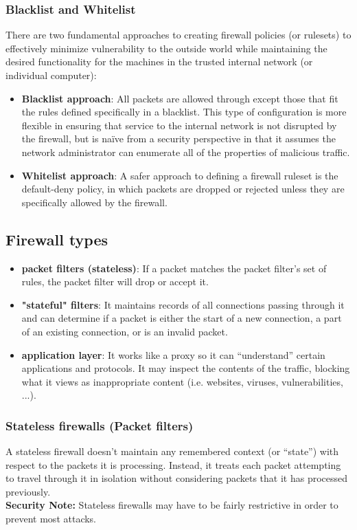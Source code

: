 \subsubsection{Blacklist and Whitelist}
There are two fundamental approaches to creating firewall policies (or rulesets) to effectively minimize vulnerability to the outside world while maintaining the desired functionality for the machines in the trusted
internal network (or individual computer):
\begin{itemize}
\item \textbf{Blacklist approach}: All packets are allowed through except those that fit the rules defined
specifically in a blacklist. This type of configuration is more flexible in ensuring that service to the internal network is not disrupted by the firewall, but is naïve from a security perspective in that it assumes the network administrator can enumerate all of the properties of malicious traffic.
\item \textbf{Whitelist approach}: A safer approach to defining a firewall ruleset is the default-deny policy, in which packets are dropped or rejected unless they are specifically allowed by the firewall.
\end{itemize}
\subsection{Firewall types}
\begin{itemize}
\item \textbf{packet filters (stateless)}: If a packet matches the packet filter's set of rules, the packet filter will drop or accept it. 
\item \textbf{"stateful" filters}: It maintains records of all connections passing through it and can determine if a packet is either the start of a new connection, a part of an existing connection, or is an invalid packet.
\item \textbf{application layer}: It works like a proxy so it can “understand” certain applications and protocols. It may inspect the contents of the traffic, blocking what it views as inappropriate content (i.e. websites, viruses, vulnerabilities, ...).
\end{itemize}
\subsubsection{Stateless firewalls (Packet filters)}
A stateless firewall doesn’t maintain any remembered context (or “state”) with respect to the packets it is processing. Instead, it treats each packet attempting to travel through it in isolation without considering packets that it has processed previously. \\
\textbf{Security Note:} Stateless firewalls may have to be fairly restrictive in order to prevent most attacks.
